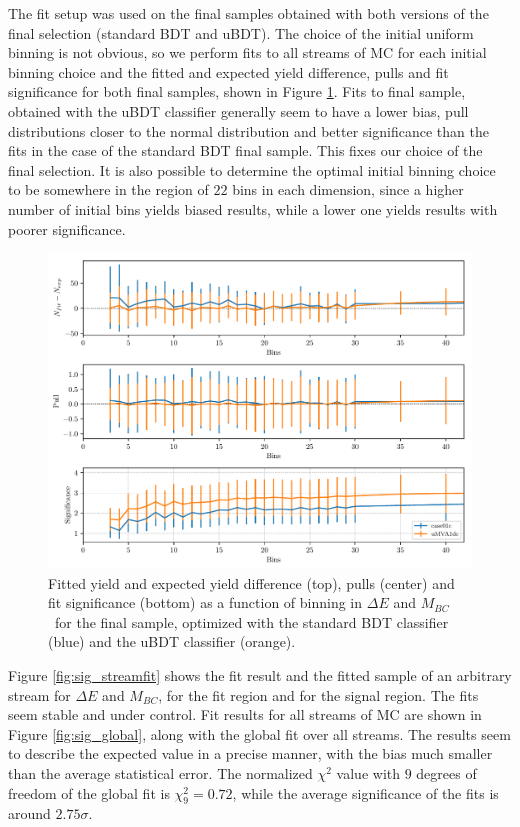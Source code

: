 \documentclass[headings=standardclasses,headings=big,oneside,a4paper,openany,12pt]{scrbook}
\newcommand {\vars}{$\Delta E$ and $M_{BC}$}
\begin{document}
The fit setup was used on the final samples obtained with both versions of the final selection (standard BDT and uBDT). The choice of the initial uniform binning is not obvious, so we perform fits to all streams of MC for each initial binning choice and the fitted and expected yield difference, pulls and fit significance for both final samples, shown in Figure \ref{fig:sig_binning}. Fits to final sample, obtained with the uBDT classifier generally seem to have a lower bias, pull distributions closer to the normal distribution and better significance than the fits in the case of the standard BDT final sample. This fixes our choice of the final selection. It is also possible to determine the optimal initial binning choice to be somewhere in the region of $22$ bins in each dimension, since a higher number of initial bins yields biased results, while a lower one yields results with poorer significance.

\begin{figure}[H]
	\centering
	\captionsetup{width=0.8\linewidth}
	\includegraphics[width=\linewidth]{fig/sig_binning}
	\caption{Fitted yield and expected yield difference (top), pulls (center) and fit significance (bottom) as a function of binning in \vars~for the final sample, optimized with the standard BDT classifier (blue) and the uBDT classifier (orange).}
	\label{fig:sig_binning}
\end{figure}

Figure \ref{fig:sig_streamfit} shows the fit result and the fitted sample of an arbitrary stream for \vars, for the fit region and for the signal region. The fits seem stable and under control. Fit results for all streams of MC are shown in Figure \ref{fig:sig_global}, along with the global fit over all streams. The results seem to describe the expected value in a precise manner, with the bias much smaller than the average statistical error. The normalized $\chi^2$ value with $9$ degrees of freedom of the global fit is $\chi^2_9 = 0.72$, while the average significance of the fits is around $2.75 \sigma$.
\end{document}

